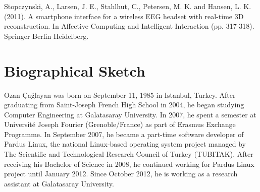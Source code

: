\documentclass[12pt]{article}
\numberwithin{equation}{section}
\numberwithin{figure}{section}
\numberwithin{table}{section}
\begin{document}
Stopczynski, A., Larsen, J. E., Stahlhut, C., Petersen, M. K. and Hansen, L. K. (2011). A smartphone interface for a wireless EEG headset with real-time 3D reconstruction. In Affective Computing and Intelligent Interaction (pp. 317-318). Springer Berlin Heidelberg.

\clearpage
\cfoot{}
\vspace*{-0.35cm}
\thispagestyle{empty}
\section*{Biographical Sketch}
\vspace*{6pt}
\par{
Ozan Çağlayan was born on September 11, 1985 in Istanbul, Turkey. After graduating from Saint-Joseph French High School in 2004,
he began studying Computer Engineering at Galatasaray University. In 2007, he spent a semester at Université Joseph Fourier (Grenoble/France) as part of Erasmus Exchange Programme.
In September 2007, he became a part-time software developer of Pardus Linux, the national Linux-based operating system project
managed by The Scientific and Technological Research Council of Turkey (TUBITAK). After receiving his Bachelor of Science in 2008, he continued working for Pardus Linux project until January 2012.
Since October 2012, he is working as a research assistant at Galatasaray University.
}
\clearpage
\end{document}
